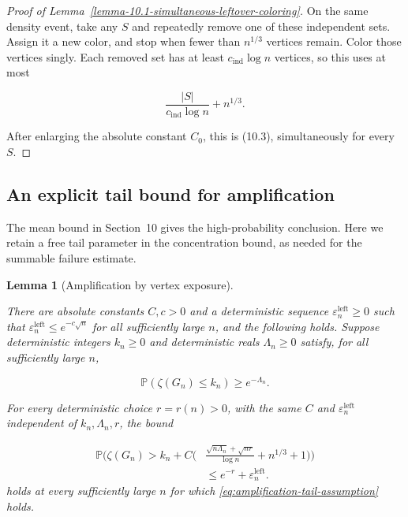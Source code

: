 \documentclass[a4paper,10pt,reqno]{amsart}
\numberwithin{equation}{section}
\newcommand{\Prob}[1]{\mathbb{P}\!\left(#1\right)}
\theoremstyle{plain}
\newtheorem{lemma}[theorem]{Lemma}
\theoremstyle{remark}
\begin{document}
\begin{proof}[Proof of Lemma~\ref{lemma-10.1-simultaneous-leftover-coloring}]
On the same density event, take any \(S\) and repeatedly remove one of
these independent sets. Assign it a new color, and stop when fewer than
\(n^{1/3}\) vertices remain. Color those vertices singly. Each removed
set has at least \(c_{\mathrm{ind}}\log n\) vertices, so this uses at most

\[
 \frac{|S|}{c_{\mathrm{ind}}\log n}+n^{1/3}.
\]

After enlarging the absolute constant $C_0$, this is (10.3), simultaneously for
every \(S\).
\end{proof}

\subsection{An explicit tail bound for amplification}
\label{app:amplification-tail}

The mean bound in Section~10 gives the high-probability conclusion. Here we
retain a free tail parameter in the concentration bound, as needed for the
summable failure estimate.
\begin{lemma}[Amplification by vertex exposure]
\label{lemma-10.2-amplification-from-a-seed}

There are absolute constants $C,c>0$ and a deterministic sequence
$\varepsilon_n^{\mathrm{left}}\ge0$ such that
$\varepsilon_n^{\mathrm{left}}\le e^{-c\sqrt n}$ for all sufficiently large
$n$, and the following holds. Suppose deterministic
integers $k_n\ge0$ and deterministic reals $\Lambda_n\ge0$ satisfy, for all
sufficiently large $n$,

\begin{equation}
 \Prob{\zeta(G_n)\le k_n}\ge e^{-\Lambda_n}.             \label{eq:amplification-tail-assumption}
\end{equation}

For every deterministic choice $r=r(n)>0$, with the same $C$ and
$\varepsilon_n^{\mathrm{left}}$ independent of $k_n,\Lambda_n,r$, the bound

\begin{equation}
\begin{split}
 \mathbb{P}\!\Bigg(\zeta(G_n)>k_n+C\bigg(
 &\frac{\sqrt{n\Lambda_n}+\sqrt{nr}}{\log n}
   +n^{1/3}+1\bigg)\Bigg)\\
 &\le e^{-r}+\varepsilon_n^{\mathrm{left}}.               \end{split}
\label{eq:amplification-tail-bound}
\end{equation}
holds at every sufficiently large $n$ for which \eqref{eq:amplification-tail-assumption} holds.

\end{lemma}
\end{document}
